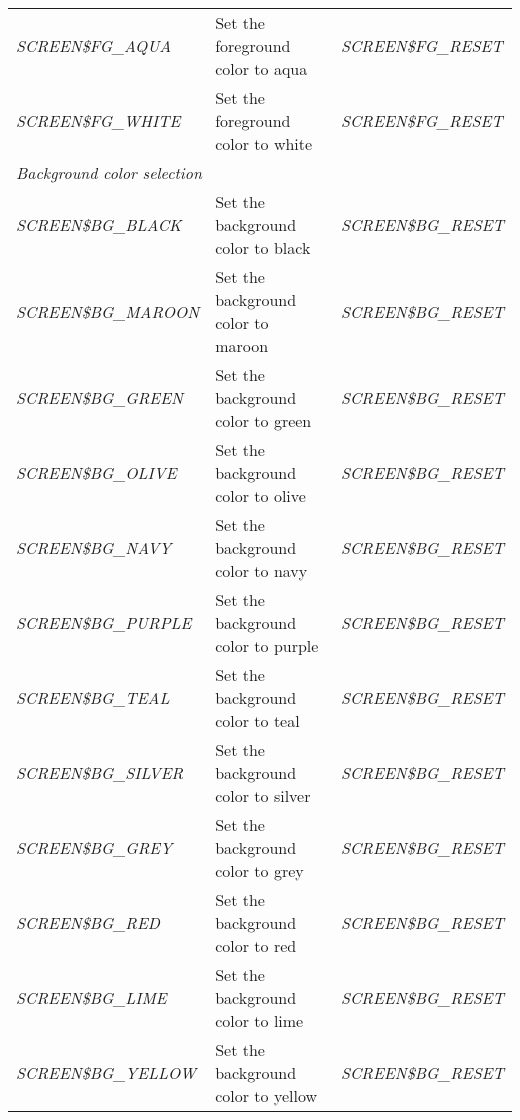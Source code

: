 \documentclass[a4paper]{book}
\begin{document}
\begin{table}[h!tb]
\begin{minipage}[h!tb]{\textwidth}
\begin{tabular}{lp{60mm}l}
\scriptsize{\textsl{SCREEN{\$}FG{\_}AQUA}   }           & Set the foreground color to aqua    & \scriptsize{\textsl{SCREEN{\$}FG{\_}RESET}} \\
\scriptsize{\textsl{SCREEN{\$}FG{\_}WHITE}  }           & Set the foreground color to white   & \scriptsize{\textsl{SCREEN{\$}FG{\_}RESET}} \\
\hline\multicolumn{3}{l}{\textit{Background color selection}} \\ \hline
\scriptsize{\textsl{SCREEN{\$}BG{\_}BLACK}  }           & Set the background color to black   & \scriptsize{\textsl{SCREEN{\$}BG{\_}RESET}} \\
\scriptsize{\textsl{SCREEN{\$}BG{\_}MAROON} }           & Set the background color to maroon  & \scriptsize{\textsl{SCREEN{\$}BG{\_}RESET}} \\
\scriptsize{\textsl{SCREEN{\$}BG{\_}GREEN}  }           & Set the background color to green   & \scriptsize{\textsl{SCREEN{\$}BG{\_}RESET}} \\
\scriptsize{\textsl{SCREEN{\$}BG{\_}OLIVE}  }           & Set the background color to olive   & \scriptsize{\textsl{SCREEN{\$}BG{\_}RESET}} \\
\scriptsize{\textsl{SCREEN{\$}BG{\_}NAVY}   }           & Set the background color to navy    & \scriptsize{\textsl{SCREEN{\$}BG{\_}RESET}} \\
\scriptsize{\textsl{SCREEN{\$}BG{\_}PURPLE} }           & Set the background color to purple  & \scriptsize{\textsl{SCREEN{\$}BG{\_}RESET}} \\
\scriptsize{\textsl{SCREEN{\$}BG{\_}TEAL}   }           & Set the background color to teal    & \scriptsize{\textsl{SCREEN{\$}BG{\_}RESET}} \\
\scriptsize{\textsl{SCREEN{\$}BG{\_}SILVER} }           & Set the background color to silver  & \scriptsize{\textsl{SCREEN{\$}BG{\_}RESET}} \\
\scriptsize{\textsl{SCREEN{\$}BG{\_}GREY}   }           & Set the background color to grey    & \scriptsize{\textsl{SCREEN{\$}BG{\_}RESET}} \\
\scriptsize{\textsl{SCREEN{\$}BG{\_}RED}    }           & Set the background color to red	  & \scriptsize{\textsl{SCREEN{\$}BG{\_}RESET}} \\
\scriptsize{\textsl{SCREEN{\$}BG{\_}LIME}   }           & Set the background color to lime    & \scriptsize{\textsl{SCREEN{\$}BG{\_}RESET}} \\
\scriptsize{\textsl{SCREEN{\$}BG{\_}YELLOW} }           & Set the background color to yellow  & \scriptsize{\textsl{SCREEN{\$}BG{\_}RESET}} \\

\end{tabular}
\end{minipage}
\end{table}
\end{document}
